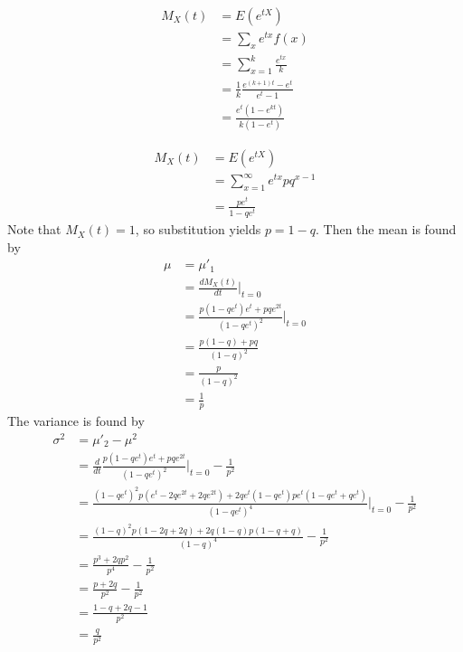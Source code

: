 \documentclass[answers]{exam}
\begin{document}
\begin{questions}

\begin{solution}
	\begin{align*}
		M_X(t) &= E(e^{tX}) \\
		       &= \sum_x e^{tx}f(x) \\
		       &= \sum_{x=1}^k \frac{e^{tx}}{k} \\
		       &= \frac{1}{k} \frac{e^{(k+1)t}-e^t}{e^t-1} \\
		       &= \frac{e^t(1-e^{kt})}{k(1-e^t)}
	\end{align*}
\end{solution}


\begin{solution}
	\begin{align*}
		M_X(t) &= E(e^{tX}) \\
		       &= \sum_{x=1}^\infty e^{tx}pq^{x-1} \\
		       &= \frac{pe^t}{1-qe^t}
	\end{align*}
	Note that $M_X(t) = 1$, so substitution yields $p=1-q$.
	Then the mean is found by
	\begin{align*}
		\mu &= \mu'_1 \\
		    &= \frac{dM_X(t)}{dt} \Big |_{t=0} \\
		    &= \frac{p(1-qe^t)e^t+pqe^{2t}}{(1-qe^t)^2} \Big |_{t=0} \\
		    &= \frac{p(1-q)+pq}{(1-q)^2} \\
		    &= \frac{p}{(1-q)^2} \\
		    &= \frac{1}{p}
	\end{align*}
	The variance is found by
	\begin{align*}
		\sigma^2 &= \mu'_2 - \mu^2 \\
			 &= \frac{d}{dt} \frac{p(1-qe^t)e^t+pqe^{2t}}{(1-qe^t)^2} \Big |_{t=0} - \frac{1}{p^2} \\
			 &= \frac{(1-qe^t)^2p(e^t-2qe^{2t}+2qe^{2t})+2qe^t(1-qe^t)pe^t(1-qe^t+qe^t)}{(1-qe^t)^4} \Big |_{t=0} - \frac{1}{p^2} \\
			 &= \frac{(1-q)^2p(1-2q+2q)+2q(1-q)p(1-q+q)}{(1-q)^4} - \frac{1}{p^2} \\
			 &= \frac{p^3+2qp^2}{p^4} - \frac{1}{p^2} \\
			 &= \frac{p+2q}{p^2} - \frac{1}{p^2} \\
			 &= \frac{1-q+2q-1}{p^2} \\
			 &= \frac{q}{p^2}
	\end{align*}
\end{solution}


\end{questions}
\end{document}
